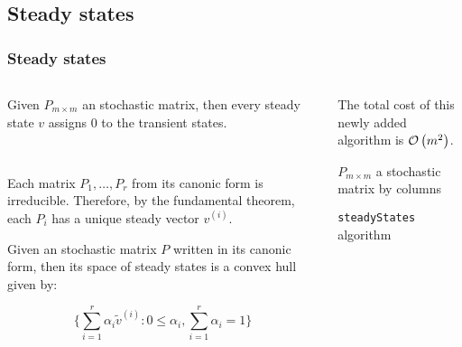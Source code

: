 \subsection{Steady states}
 \begin{frame}\frametitle{Steady states}
    \vspace{2em}
    \begin{columns}
     \begin{column}{0.5\textwidth}
        \begin{proposition}
        Given \(P_{m\times m}\) an stochastic matrix, then every steady state \(v\) 
        assigns \(0\) to the transient states.
        
        ~\\
        \label{prop:ss-transient-zero}
        \end{proposition}
        Each matrix \(P_1, \ldots, P_r\) from its canonic form is irreducible. 
        Therefore, by the fundamental theorem, each \(P_i\) has a unique steady vector 
        \(v^{(i)}\). 
        
        \begin{proposition}
        Given an stochastic matrix \(P\) written in its canonic form, then its space of 
        steady states is a convex hull given by:

        \[
        \bigg\{\sum_{i = 1}^r \alpha_i \widetilde{v}^{(i)}: 0 \le \alpha_i, \sum_{i = 1}^{r} \alpha_i = 1\bigg\}
        \]
        \end{proposition}
    \end{column}
    \begin{column}{0.5\textwidth}
        The total cost of this newly added algorithm is \(\mathcal{O}\left(m^2\right)\).
        \vspace{-1em}
        \begin{algorithm}[H]
        \begin{algorithmic}[1]
        \REQUIRE $P_{m \times m}$ a stochastic matrix by columns
        \NEWLINE
        \ENDFOR
        \NEWLINE
        \end{algorithmic}
        \caption{\small\texttt{steadyStates} algorithm}
        \label{alg:steadyStates}
        \end{algorithm}
    \end{column}
    \end{columns}
\end{frame}
